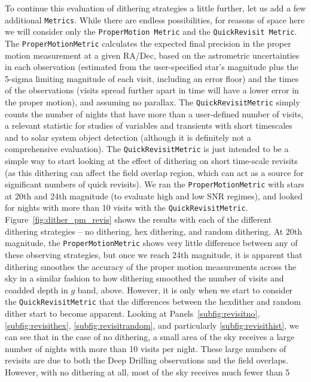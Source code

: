 \documentclass[]{spie}  %
\begin{document}
To continue this evaluation of dithering strategies a little further,
let us add a few additional {\tt Metrics}. While there are endless
possibilities, for reasons of space here we will consider only the
{\tt ProperMotion Metric} and the {\tt QuickRevisit Metric}. The {\tt ProperMotionMetric}
calculates the expected final precision in the proper motion measurement at a
given RA/Dec, based on the astrometric uncertainties in each observation
(estimated from the user-specified star's magnitude plus the 5-sigma
limiting magnitude of each visit, including an error floor) and the
times of the observations (visits spread further apart in time will
have a lower error in the proper motion), and assuming no parallax.  The
{\tt QuickRevisitMetric} simply counts the number of nights that have more
than a user-defined number of visits, a relevant statistic for
studies of variables and transients with short timescales and to solar
system object detection (although it is definitely not a comprehensive
evaluation). The {\tt QuickRevisitMetric} is just intended to be a
simple way to start looking at the effect of dithering on short
time-scale revisits (as this dithering can affect the field overlap
region, which can act as a source for significant numbers of quick
revisits). We ran the {\tt ProperMotionMetric} with stars at 20th and 24th
magnitude (to evaluate high and low SNR regimes), and looked for
nights with more than 10 visits with the
{\tt QuickRevisitMetric}. Figure~\ref{fig:dither_pm_revis} shows the results
with each of the different dithering strategies -- no dithering, hex
dithering, and random dithering. At 20th magnitude, the
{\tt ProperMotionMetric} shows very little difference between any of these
observing strategies, but once we reach 24th magnitude, it is apparent
that dithering smoothes the accuracy of the proper motion
measurements across the sky in a similar fashion to how dithering smoothed the
number of visits and coadded depth in $g$ band, above. However, it is
only when we start to consider the {\tt QuickRevisitMetric} that the
differences between the hexdither and random dither start to become
apparent. Looking at Panels~\ref{subfig:revisitno},
\ref{subfig:revisithex}, \ref{subfig:revisitrandom}, and particularly
\ref{subfig:revisithist}, we can see that in the case of no dithering,
a small area of the sky receives a large number of nights with more
than 10 visits per night. These large numbers of revisits are
due to both the Deep Drilling observations and the field
overlaps. However, with no dithering at all, most of the sky receives much fewer than 5
\end{document}
